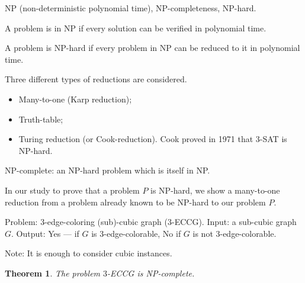 \documentclass[12pt,a4paper]{article} \usepackage{fontspec}
\newtheorem{theorem}{Theorem} \newtheorem{definition}{Definition}
\begin{document}
NP (non-deterministic polynomial time), NP-completeness, NP-hard.

A problem is in NP if every solution can be verified in polynomial time.

A problem is NP-hard if every problem in NP can be reduced to it in polynomial
time.

Three different types of reductions are considered.  \begin{itemize} \item
Many-to-one (Karp reduction); \item Truth-table; \item Turing reduction (or
Cook-reduction). Cook proved in 1971 that \(3\)-SAT is NP-hard.  \end{itemize}

NP-complete: an NP-hard problem which is itself in NP.\@

In our study to prove that a problem \(P\) is NP-hard, we show a many-to-one
reduction from a problem already known to be NP-hard to our problem \(P\).

Problem: \(3\)-edge-coloring (sub)-cubic graph (\(3\)-ECCG).  Input: a sub-cubic
graph \(G\).  Output: Yes --- if \(G\) is \(3\)-edge-colorable, No if \(G\) is
not \(3\)-edge-colorable.

Note: It is enough to consider cubic instances.

\begin{theorem} The problem \(3\)-ECCG is NP-complete.  \end{theorem}
\end{document}
